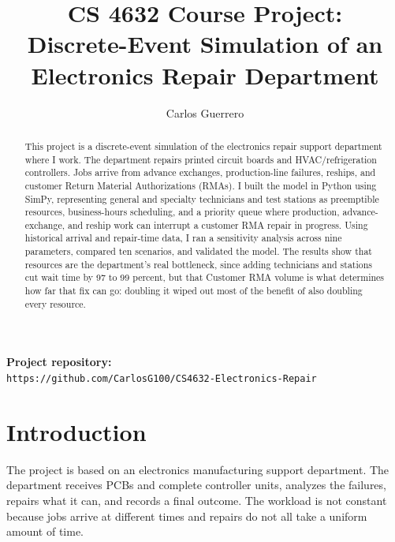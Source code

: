 \documentclass[12pt, letterpaper, twoside]{article}
\title{\textbf{CS 4632 Course Project:\\
Discrete-Event Simulation of an Electronics Repair Department}}
\author{Carlos Guerrero}
\affiliation{Kennesaw State University}
\begin{document}
\maketitle

\begin{abstract}
    \noindent
    This project is a discrete-event simulation of the electronics repair support
    department where I work. The department repairs printed circuit boards and
    HVAC/refrigeration controllers. Jobs arrive from advance exchanges, production-line
    failures, reships, and customer Return Material Authorizations (RMAs). I built the
    model in Python using SimPy, representing general and specialty technicians and test
    stations as preemptible resources, business-hours scheduling, and a priority
    queue where production, advance-exchange, and reship work can interrupt a customer RMA
    repair in progress. Using historical arrival and repair-time data, I ran a sensitivity
    analysis across nine parameters, compared ten scenarios, and validated the model. 
    The results show that resources are the department's real bottleneck, since adding technicians and stations 
    cut wait time by 97 to 99 percent, but that Customer RMA volume is what determines how far that fix can go:
    doubling it wiped out most of the benefit of also doubling every resource.

\end{abstract}

\vspace{1cm}

\noindent
\textbf{Project repository:}\\
\texttt{https://github.com/CarlosG100/CS4632-Electronics-Repair}

\thispagestyle{firstpage}

\pagebreak

\tableofcontents


\pagebreak


\newgeometry{}

\section{Introduction}
\label{sec:introduction}

The project is based on an electronics manufacturing support department. The department
receives PCBs and complete controller units, analyzes the failures, repairs what it can,
and records a final outcome. The workload is not constant because jobs arrive at
different times and repairs do not all take a uniform amount of time.
\end{document}
